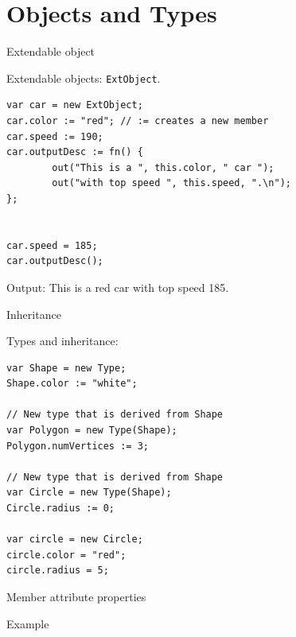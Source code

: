 \documentclass[ucs,9pt]{beamer}
\begin{document}
\section{Objects and Types}
\begin{frame}[fragile]{Extendable object}
	\begin{block}{Extendable objects:  \lstinline!ExtObject!.}
		\begin{lstlisting}
var car = new ExtObject;
car.color := "red"; // := creates a new member
car.speed := 190;
car.outputDesc := fn() {
		out("This is a ", this.color, " car ");
		out("with top speed ", this.speed, ".\n");
};


car.speed = 185;
car.outputDesc();
		\end{lstlisting}
	\end{block}
	Output: This is a red car with top speed 185.
\end{frame}

\begin{frame}[fragile]{Inheritance}
	\begin{block}{Types and inheritance:}
		\begin{lstlisting}
var Shape = new Type;
Shape.color := "white";

// New type that is derived from Shape
var Polygon = new Type(Shape); 
Polygon.numVertices := 3;

// New type that is derived from Shape
var Circle = new Type(Shape); 
Circle.radius := 0;

var circle = new Circle;
circle.color = "red";
circle.radius = 5;
		\end{lstlisting}
	\end{block}
\end{frame}
 
\begin{frame}{Member attribute properties}
	\begin{block}{Example}
		
	\end{block}
\end{frame}

\end{document}
